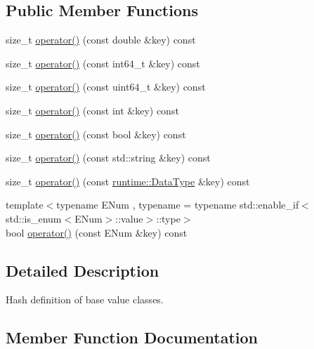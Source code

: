\subsection*{Public Member Functions}
\begin{DoxyCompactItemize}
\item 
size\+\_\+t \hyperlink{classtvm_1_1BaseValueHash_ae5264c45c41cfbb82d8944d6b7402f8a}{operator()} (const double \&key) const 
\item 
size\+\_\+t \hyperlink{classtvm_1_1BaseValueHash_a75e98fc026241cf33f36ec817e73f503}{operator()} (const int64\+\_\+t \&key) const 
\item 
size\+\_\+t \hyperlink{classtvm_1_1BaseValueHash_a7e2db7c92be284347da2bc7736c2f0b4}{operator()} (const uint64\+\_\+t \&key) const 
\item 
size\+\_\+t \hyperlink{classtvm_1_1BaseValueHash_af88eb7061b7d5db3ce7a045a331df9fc}{operator()} (const int \&key) const 
\item 
size\+\_\+t \hyperlink{classtvm_1_1BaseValueHash_a0878f3a6a7e9633e9b36c995a365e49d}{operator()} (const bool \&key) const 
\item 
size\+\_\+t \hyperlink{classtvm_1_1BaseValueHash_a5d95cf4c946c882342eb33133cf02c2a}{operator()} (const std\+::string \&key) const 
\item 
size\+\_\+t \hyperlink{classtvm_1_1BaseValueHash_ab695a0b7131118a9083229b18966d9e7}{operator()} (const \hyperlink{classtvm_1_1runtime_1_1DataType}{runtime\+::\+Data\+Type} \&key) const 
\item 
{\footnotesize template$<$typename E\+Num , typename  = typename std\+::enable\+\_\+if$<$std\+::is\+\_\+enum$<$\+E\+Num$>$\+::value$>$\+::type$>$ }\\bool \hyperlink{classtvm_1_1BaseValueHash_a3e26f78c0d21151d09a84b625445e081}{operator()} (const E\+Num \&key) const 
\end{DoxyCompactItemize}


\subsection{Detailed Description}
Hash definition of base value classes. 

\subsection{Member Function Documentation}
